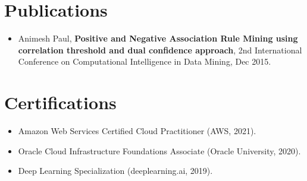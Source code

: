 \documentclass[letterpaper,11pt]{article}
\newcommand{\resumeItem}[2]{
  \item\small{
    \textbf{#1}{ #2 \vspace{-2pt}}
  }
}
\newcommand{\resumeSubItem}[2]{\resumeItem{#1}{#2}\vspace{-4pt}}
\newcommand{\resumeSubHeadingListStart}{\begin{itemize}[leftmargin=*]}
\newcommand{\resumeSubHeadingListEnd}{\end{itemize}}
\begin{document}
\section{Publications}
 \resumeSubHeadingListStart
  \resumeSubItem{}{Animesh Paul,
  \textbf{Positive and Negative Association Rule Mining using correlation threshold and dual confidence approach}, 2nd International Conference on Computational Intelligence in Data Mining, Dec 2015.}
 \resumeSubHeadingListEnd


\section{Certifications}
 \resumeSubHeadingListStart
 \resumeSubItem{}{Amazon Web Services Certified Cloud Practitioner (AWS, 2021).}
 \resumeSubItem{}{Oracle Cloud Infrastructure Foundations Associate (Oracle University, 2020).}
 \resumeSubItem{}{Deep Learning Specialization (deeplearning.ai, 2019).}
 \resumeSubHeadingListEnd
\end{document}
